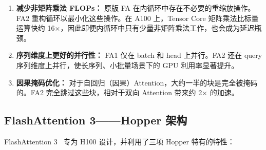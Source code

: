 \begin{enumerate}
  \item \textbf{减少非矩阵乘法 FLOPs：} 原版 FA 在内循环中存在不必要的重缩放操作。FA2 重构循环以最小化这些操作。在 A100 上，Tensor Core 矩阵乘法比标量运算快约 16$\times$，因此即便内循环中只有少量非矩阵乘法工作，也会成为延迟瓶颈。
  \item \textbf{序列维度上更好的并行性：} FA1 仅在 batch 和 head 上并行。FA2 还在 query 序列维度上并行，使长序列、小批量场景下的 GPU 利用率显著提升。
  \item \textbf{因果掩码优化：} 对于自回归（因果）Attention，大约一半的块是完全被掩码的。FA2 完全跳过这些块，相对于双向 Attention 带来约 2$\times$ 的加速。
\end{enumerate}

\subsection{FlashAttention 3——Hopper 架构}
\label{flash-attention-3-hopper-architecture}

FlashAttention 3~\cite{shah2024flashattention3} 专为 H100 设计，并利用了三项 Hopper 特有的特性：


